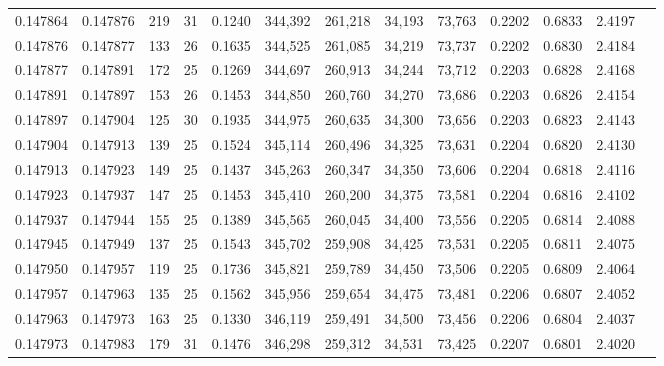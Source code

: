 \begin{tabular}{rrrrrrrrrrrrr}
0.147864 & 0.147876 & 219 &  31 &                                     0.1240 & 344,392 & 261,218 &  34,193 &  73,763 & 0.2202 & 0.6833 & 2.4197 \\
0.147876 & 0.147877 & 133 &  26 &                                     0.1635 & 344,525 & 261,085 &  34,219 &  73,737 & 0.2202 & 0.6830 & 2.4184 \\
0.147877 & 0.147891 & 172 &  25 &                                     0.1269 & 344,697 & 260,913 &  34,244 &  73,712 & 0.2203 & 0.6828 & 2.4168 \\
0.147891 & 0.147897 & 153 &  26 &                                     0.1453 & 344,850 & 260,760 &  34,270 &  73,686 & 0.2203 & 0.6826 & 2.4154 \\
0.147897 & 0.147904 & 125 &  30 &                                     0.1935 & 344,975 & 260,635 &  34,300 &  73,656 & 0.2203 & 0.6823 & 2.4143 \\
0.147904 & 0.147913 & 139 &  25 &                                     0.1524 & 345,114 & 260,496 &  34,325 &  73,631 & 0.2204 & 0.6820 & 2.4130 \\
0.147913 & 0.147923 & 149 &  25 &                                     0.1437 & 345,263 & 260,347 &  34,350 &  73,606 & 0.2204 & 0.6818 & 2.4116 \\
0.147923 & 0.147937 & 147 &  25 &                                     0.1453 & 345,410 & 260,200 &  34,375 &  73,581 & 0.2204 & 0.6816 & 2.4102 \\
0.147937 & 0.147944 & 155 &  25 &                                     0.1389 & 345,565 & 260,045 &  34,400 &  73,556 & 0.2205 & 0.6814 & 2.4088 \\
0.147945 & 0.147949 & 137 &  25 &                                     0.1543 & 345,702 & 259,908 &  34,425 &  73,531 & 0.2205 & 0.6811 & 2.4075 \\
0.147950 & 0.147957 & 119 &  25 &                                     0.1736 & 345,821 & 259,789 &  34,450 &  73,506 & 0.2205 & 0.6809 & 2.4064 \\
0.147957 & 0.147963 & 135 &  25 &                                     0.1562 & 345,956 & 259,654 &  34,475 &  73,481 & 0.2206 & 0.6807 & 2.4052 \\
0.147963 & 0.147973 & 163 &  25 &                                     0.1330 & 346,119 & 259,491 &  34,500 &  73,456 & 0.2206 & 0.6804 & 2.4037 \\
0.147973 & 0.147983 & 179 &  31 &                                     0.1476 & 346,298 & 259,312 &  34,531 &  73,425 & 0.2207 & 0.6801 & 2.4020 \\

\end{tabular}
